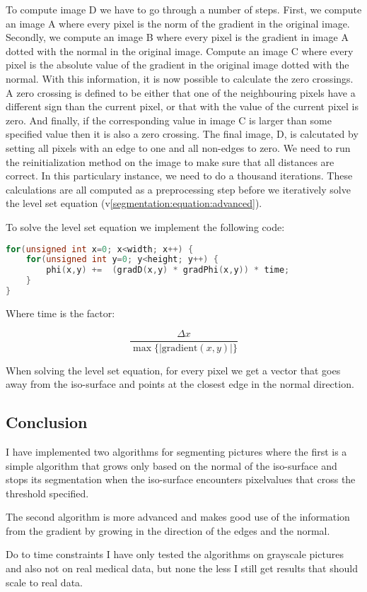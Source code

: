 To compute image D we have to go through a number of steps. First, we compute an image A where every pixel is the norm of the gradient in the original image. Secondly, we compute an image B where every pixel is the gradient in image A dotted with the normal in the original image. Compute an image C where every pixel is the absolute value of the gradient in the original image dotted with the normal.
With this information, it is now possible to calculate the zero crossings. A zero crossing is defined to be either that one of the neighbouring pixels have a different sign than the current pixel, or that with the value of the current pixel is zero. And finally, if the corresponding value in image C is larger than some specified value then it is also a zero crossing. The final image, D, is calcutated by setting all pixels with an edge to one and all non-edges to zero. We need to run the reinitialization method on the image to make sure that all distances are correct. In this particulary instance, we need to do a thousand iterations. These calculations are all computed as a preprocessing step before we iteratively solve the level set equation (v\ref{segmentation:equation:advanced}).

To solve the level set equation we implement the following code:
\begin{lstlisting}[language=c++]
for(unsigned int x=0; x<width; x++) {
    for(unsigned int y=0; y<height; y++) {
        phi(x,y) +=  (gradD(x,y) * gradPhi(x,y)) * time;
    }
}
\end{lstlisting}

Where time is the factor:

\begin{equation*}
  \dfrac{\Delta x} {\max \{|\textrm{gradient}(x,y)|\}} 
\end{equation*}

When solving the level set equation, for every pixel we get a vector that goes away from the iso-surface and points at the closest edge in the normal direction.

\subsection{Conclusion}
\label{segmentation:conclusion}

I have implemented two algorithms for segmenting pictures where the first is a simple algorithm that grows only based on the normal of the iso-surface and stops its segmentation when the iso-surface encounters pixelvalues that cross the threshold specified.

The second algorithm is more advanced and makes good use of the information from the gradient by growing in the direction of the edges and the normal.

Do to time constraints I have only tested the algorithms on grayscale pictures and also not on real medical data, but none the less I still get results that should scale to real data.

